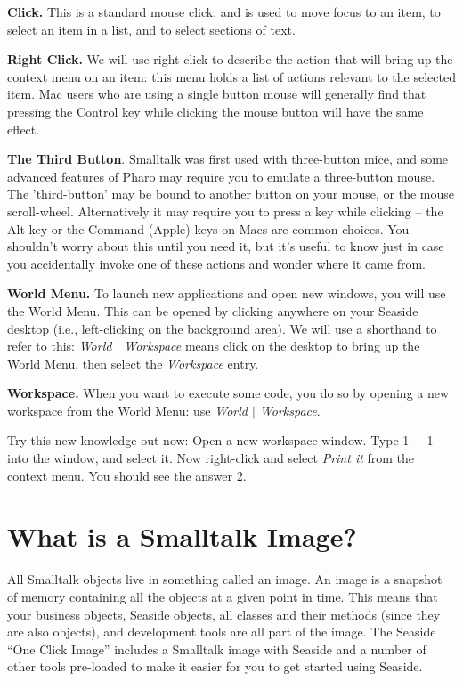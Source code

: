 \documentclass[a4paper,10pt,twoside]{book}
\newcommand{\ct}[1]{{\small\ttfamily\textup{#1}}}
\begin{document}
\textbf{Click.} This is a standard mouse click, and is used to move focus to an item, to select an item in a list, and to select sections of text.

\textbf{Right Click.} We will use right-click to describe the action that will bring up the context menu on an item: this menu holds a list of actions relevant to the selected item. Mac users who are using a single button mouse will generally find that pressing the Control key while clicking the mouse button will have the same effect.

\textbf{The Third Button}. Smalltalk was first used with three-button mice, and some advanced features of Pharo may require you to emulate a three-button mouse. The 'third-button' may be bound to another button on your mouse, or the mouse scroll-wheel. Alternatively it may require you to press a key while clicking -- the Alt key or the Command (Apple) keys on Macs are common choices. You shouldn't worry about this until you need it, but it's useful to know just in case you accidentally invoke one of these actions and wonder where it came from.

\textbf{World Menu.} To launch new applications and open new windows, you will use the World Menu. This can be opened by clicking anywhere on your Seaside desktop (i.e., left-clicking on the background area). We will use a shorthand to refer to this: \textit{World $|$ Workspace} means click on the desktop to bring up the World Menu, then select the \textit{Workspace} entry.

\textbf{Workspace.} When you want to execute some code, you do so by opening a new workspace from the World Menu: use \textit{World $|$ Workspace}.

Try this new knowledge out now:  Open a new workspace window. Type \ct{1 + 1} into the window, and select it. Now right-click and select \textit{Print it} from the context menu. You should see the answer \ct{2}.

\section{What is a Smalltalk Image?}
\label{book:gettingstarted:pharo:whatisimage}

All Smalltalk objects live in something called an image. An image is a snapshot of memory containing all the objects at a given point in time. This means that your business objects, Seaside objects, all classes and their methods (since they are also objects), and development tools are all part of the image. The Seaside ``One Click Image'' includes a Smalltalk image with Seaside and a number of other tools pre-loaded to make it easier for you to get started using Seaside.
\end{document}
